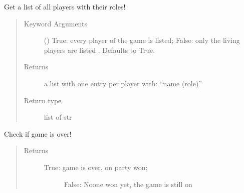 \documentclass[letterpaper,10pt,english]{sphinxmanual}
\begin{document}
\begin{fulllineitems}
\begin{fulllineitems}
\begin{quote}
\begin{description}
\end{description}\end{quote}

\end{fulllineitems}


\begin{fulllineitems}
\label{\detokenize{chatwolf:chatwolf.game.Game.get_players_role}}
Get a list of all players with their roles!
\begin{quote}\begin{description}
\item[{Keyword Arguments}] \leavevmode
{} (\sphinxstyleliteralemphasis{\sphinxupquote{, }}) \textendash{} True: every player of the game is listed; False: only the living players are listed . Defaults to True.

\item[{Returns}] \leavevmode
a list with one entry per player with: “name (role)”

\item[{Return type}] \leavevmode
list of str

\end{description}\end{quote}

\end{fulllineitems}


\begin{fulllineitems}
\label{\detokenize{chatwolf:chatwolf.game.Game.is_end}}
Check if game is over!
\begin{quote}\begin{description}
\item[{Returns}] \leavevmode
\begin{description}
\item[{True: game is over, on party won;}] \leavevmode
False: Noone won yet, the game is still on


\end{description}
\end{description}
\end{quote}
\end{fulllineitems}
\end{fulllineitems}
\end{document}
